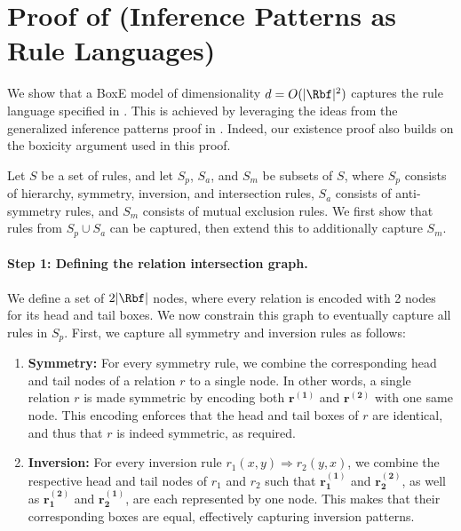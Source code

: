 \documentclass{article}
\begin{document}
\section{Proof of  (Inference Patterns as Rule Languages)}
\label{app:lang}

We show that a BoxE model of dimensionality $d = O(|\Rbf|^2)$ captures the rule language specified in . This is achieved by leveraging the ideas from the generalized inference patterns proof in . Indeed, our existence proof also builds on the boxicity argument used in this proof.


Let $S$ be a set of rules, and let $S_{p}$, $S_a$, and $S_m$ be subsets of $S$, where $S_p$ consists of hierarchy, symmetry, inversion, and intersection rules, $S_a$ consists of  anti-symmetry rules, and $S_m$ consists of mutual exclusion rules. We first show that rules from $S_p \cup S_a$ can be captured, then extend this to additionally capture $S_m $.

\paragraph{Step 1: Defining the relation intersection graph.} We define a set of $2|\Rbf|$ nodes, where every relation is encoded with 2 nodes for its head and tail boxes. We now constrain this graph to eventually capture all rules in $S_p$. First, we capture all symmetry and inversion rules as follows:
\begin{enumerate}
    \item \textbf{Symmetry:} For every symmetry rule, we combine the corresponding head and tail nodes of a relation $r$ to a single node. In other words, a single relation $r$  is made symmetric by encoding both $\bm{r^{(1)}}$ and $\bm{r^{(2)}}$ with one same node. This encoding enforces that the head and tail boxes of $r$ are identical, and thus that $r$ is indeed symmetric, as required. 
    \item \textbf{Inversion:} For every inversion rule $r_1(x,y) \Rightarrow r_2(y,x)$, we combine the respective head and tail nodes of $r_1$ and $r_2$ such that $\bm{r_{1}^{(1)}}$ and $\bm{r_{2}^{(2)}}$, as well as $\bm{r_{1}^{(2)}}$ and $\bm{r_{2}^{(1)}}$, are each represented by one node. This makes that their corresponding boxes are equal, effectively capturing inversion patterns. 
\end{enumerate}
\end{document}
